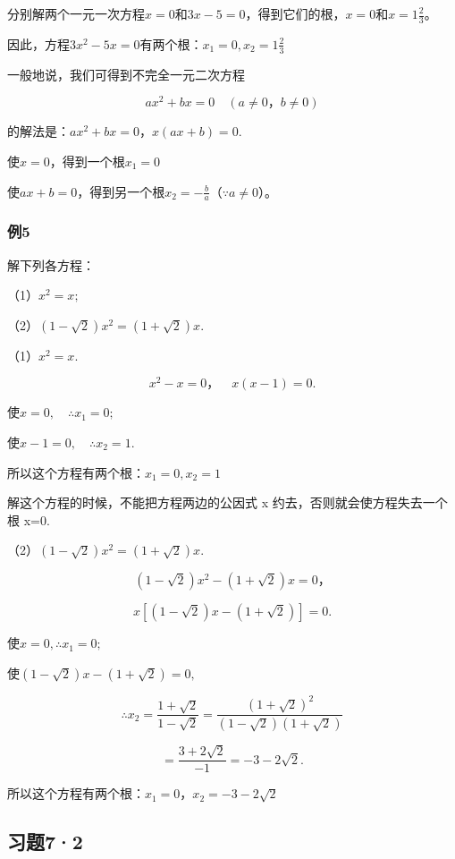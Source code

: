 分别解两个一元一次方程\(x = 0\)和\(3x - 5 = 0\)，得到它们的根，\(x = 0\)和\(x = 1\frac{2}{3}\)。

因此，方程\(3x^{2} - 5x = 0\)有两个根：\(x_{1} = 0, x_{2} = 1\frac{2}{3}\)

一般地说，我们可得到不完全一元二次方程

\[
a x ^ {2} + b x = 0 \quad (a \neq 0\text{，} b \neq 0)
\]

的解法是：\(ax^2 +bx = 0\)，\(x(ax + b) = 0.\)

使\(x = 0\)，得到一个根\(x_{1} = 0\)

使\(ax + b = 0\)，得到另一个根\(x_{2} = -\frac{b}{a}\)（\(\because a \neq 0\)）。

\subsubsection{例5}

解下列各方程：

（1）\(x^{2} = x;\)

（2）\((1 - \sqrt{2})x^{2} = (1 + \sqrt{2})x.\)

 （1）\(x^{2} = x.\)

\[
x ^ {2} - x = 0\text{，} \quad x (x - 1) = 0.
\]

使\(x = 0, \quad \therefore x_{1} = 0;\)

使\(x - 1 = 0, \quad \therefore x_{2} = 1.\)

所以这个方程有两个根：\(x_{1} = 0, x_{2} = 1\)

 解这个方程的时候，不能把方程两边的公因式 x
约去，否则就会使方程失去一个根 x=0.

（2）\((1 - \sqrt{2})x^{2} = (1 + \sqrt{2})x.\)

\[
(1 - \sqrt {2}) x ^ {2} - (1 + \sqrt {2}) x = 0\text{，}
\]

\[
x[(1 - \sqrt{2})x - (1 + \sqrt{2})] = 0.
\]

使\(x = 0, \therefore x_{1} = 0;\)

使\((1 - \sqrt{2})x - (1 + \sqrt{2}) = 0,\)

\[
\therefore x _ {2} = \frac{1 + \sqrt {2}}{1 - \sqrt {2}} = \frac{(1 + \sqrt {2}) ^ {2}}{(1 - \sqrt {2}) (1 + \sqrt {2})}
\]

\[
= \frac{3 + 2 \sqrt {2}}{- 1} = - 3 - 2 \sqrt {2}.
\]

所以这个方程有两个根：\(x_{1} = 0\)，\(x_{2} = -3 - 2\sqrt{2}\)

\subsection{习题7·2}

